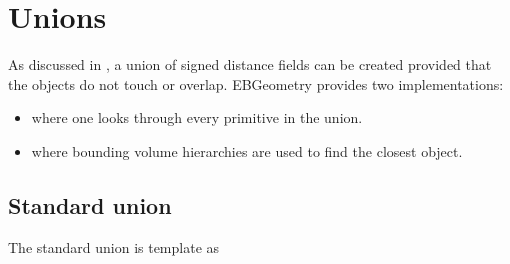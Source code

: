 \documentclass[letterpaper,10pt,english]{sphinxmanual}
\begin{document}
\section{Unions}
\label{\detokenize{ImplemUnion:unions}}\label{\detokenize{ImplemUnion:chap-union}}\label{\detokenize{ImplemUnion::doc}}
\sphinxAtStartPar
As discussed in {\hyperref[\detokenize{Concepts:chap-concepts}]{}}, a union of signed distance fields can be created provided that the objects do not touch or overlap.
EBGeometry provides two implementations:
\begin{itemize}
\item {} 
\sphinxAtStartPar
{} where one looks through every primitive in the union.

\item {} 
\sphinxAtStartPar
{} where bounding volume hierarchies are used to find the closest object.

\end{itemize}


\subsection{Standard union}
\label{\detokenize{ImplemUnion:standard-union}}
\sphinxAtStartPar
The standard union is template as
\end{document}
